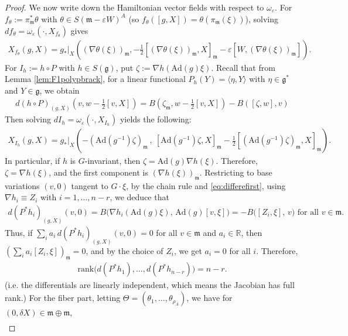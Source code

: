 \documentclass[11pt]{amsart}
\theoremstyle{definition}
\theoremstyle{plain}
\theoremstyle{conclusion}
\begin{document}
\begin{proof}
We now write down the Hamiltonian vector fields with respect to $\omega_\varepsilon$. For $f_\theta:=\pi_{\mathfrak{m}}^*\theta$ with $\theta\in S(\mathfrak{m} -\varepsilon W)^A$ (so $f_\theta([g,X])=\theta(\pi_\mathfrak{m}(\xi))$), solving  $df_\theta=\omega_\varepsilon(\cdot,X_{f_\theta})$ gives \cite{MR2141306} \begin{align}
X_{f_\theta}(g,X) = g_*\vert_X\left( (\nabla\theta(\xi))_{\mathfrak{m}} ,  -\frac{1}{2}[(\nabla\theta(\xi))_{\mathfrak{m}},X]_{\mathfrak{m}}-\varepsilon[W,(\nabla\theta(\xi))_{\mathfrak{m}}]  \right). \label{eq:vectorf2}
\end{align} For $I_h:= h \circ P$ with $h\in S(\mathfrak{g})$, put $\zeta:=\nabla h(\mathrm{Ad}(g)\xi)$. Recall that from Lemma \ref{lem:F1polypbrack}, for a linear functional $P_h(Y) = \langle \eta,Y\rangle$ with $\eta \in \mathfrak{g}^*$ and $Y \in \mathfrak{g}$, we obtain \begin{align}
    d (h \circ P)_{(g,X)}\left(v,w - \frac{1}{2}[v,X]\right) =  B\left(\zeta_\mathfrak{m},w -\frac{1}{2}[v,X]\right) - B([\zeta,w],v) \label{eq:differefirst}
\end{align} Then solving $dI_h = \omega_\varepsilon(\cdot, X_{I_h})$ yields the following: \begin{align}
X_{I_h}(g,X) = g_*\vert_X\left(- (\mathrm{Ad}(g^{-1})\zeta)_{\mathfrak{m}}\ ,\ [\mathrm{Ad}(g^{-1})\zeta,X]_{\mathfrak{m}}-\frac{1}{2}[(\mathrm{Ad}(g^{-1})\zeta)_{\mathfrak{m}},X]_{\mathfrak{m}}\right). \label{eq:vectorf1}
\end{align} In particular, if $h$ is $G$-invariant, then $\zeta=\mathrm{Ad}(g)\nabla h(\xi)$. Therefore, $\zeta = \nabla h(\xi)$, and the first component is $(\nabla h(\xi))_{\mathfrak{m}}$.  Restricting to base variations $(v,0)$ tangent to $G \cdot \xi$, by the chain rule and \eqref{eq:differefirst}, using $\nabla h_i\equiv Z_i$ with $i = 1,\ldots,n-r$, we deduce that \begin{align*}
d(P^*h_i)_{(g,X)}(v,0) = B\big(\nabla h_i(\mathrm{Ad}(g)\xi),\,\mathrm{Ad}(g)[v,\xi]\big) = -B\big([Z_i,\xi],\,v\big) \text{ for all } v \in \mathfrak{m}.
\end{align*} Thus, if $\sum_i a_i\,d(P^*h_i)_{(g,X)}(v,0) = 0$ for all $v \in \mathfrak{m}$ and $a_i \in \mathbb{R}$, then $\left(\sum_i a_i[Z_i,\xi]\right)_\mathfrak{m} = 0$, and by the choice of $Z_i$, we get $a_i=0$ for all $i$. Therefore, \begin{align}
\mathrm{rank}\bigl(d(P^*h_1),\ldots,d(P^*h_{n-r})\bigr) = n-r.
\end{align}  (i.e. the differentials are linearly independent, which means the Jacobian has full rank.) For the fiber part, letting $\Theta=(\theta_1,\ldots,\theta_{\rho_A})$, we have for $(0,\delta X)\in \mathfrak{m}\oplus\mathfrak{m}$, \begin{align*}

\end{align*}
\end{proof}
\end{document}
